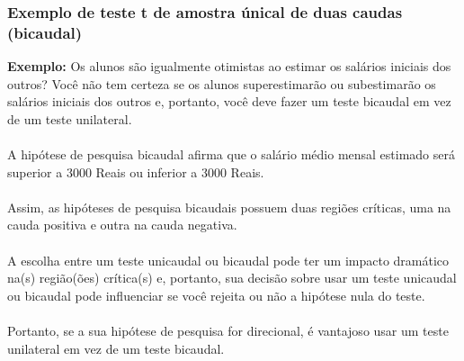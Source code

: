 \documentclass[11pt]{beamer}
\begin{document}
\begin{frame}
\frametitle{Exemplo de teste t de amostra únical de duas caudas (bicaudal)}
\textbf{Exemplo:} Os alunos são igualmente otimistas ao estimar os salários iniciais dos outros? 
Você não tem certeza se os alunos superestimarão ou subestimarão os salários iniciais dos outros e, portanto, você deve fazer um teste bicaudal em vez de um teste unilateral.\\~\\ 

A hipótese de pesquisa bicaudal afirma que o salário médio mensal estimado será superior a 3000 Reais ou inferior a 3000 Reais. \\~\\

Assim, as hipóteses de pesquisa bicaudais possuem duas regiões críticas, uma na cauda positiva e outra na cauda negativa. \\~\\

A escolha entre um teste unicaudal ou bicaudal pode ter um impacto dramático na(s) região(ões) crítica(s) e, portanto, sua decisão sobre usar um teste unicaudal ou bicaudal pode influenciar se você rejeita ou não a hipótese nula do teste. \\~\\

Portanto, se a sua hipótese de pesquisa for direcional, é vantajoso usar um teste unilateral em vez de um teste bicaudal.
\end{frame}
\end{document}
